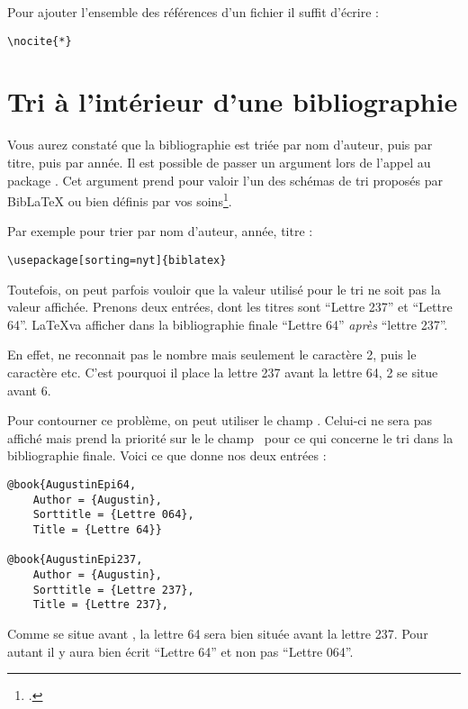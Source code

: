 Pour ajouter l'ensemble des références d'un fichier  il suffit d'écrire :
\begin{verbatim}
\nocite{*}
\end{verbatim}

\section{Tri à l'intérieur d'une bibliographie}

Vous aurez constaté que la bibliographie est triée par nom d'auteur, puis par titre, puis par année. Il est possible de passer un argument  lors de l'appel au package . Cet argument prend pour valoir l'un des schémas de tri proposés par BibLaTeX ou bien définis par vos soins\footcites[Pour les schémas de tri standards voir][]{biblatex_tri}[pour les schémas personnalisés voir][qui nécéssite l'utilisation de Biber (\cf{} \pageref{biber}]{biblatex_triperso}.

Par exemple pour trier par nom d'auteur, année, titre :

\begin{verbatim}
\usepackage[sorting=nyt]{biblatex}
\end{verbatim}

Toutefois, on peut parfois vouloir que  la valeur utilisé pour le tri ne soit pas la valeur affichée. Prenons deux entrées, dont les titres sont \enquote{Lettre 237} et \enquote{Lettre 64}. \LaTeX va afficher dans la bibliographie finale
\enquote{Lettre 64} \emph{après} \enquote{lettre 237}. 

En effet,  ne reconnait pas le nombre  mais seulement le caractère {2}, puis le caractère  etc. C'est pourquoi il place la lettre 237 avant la lettre 64, 2 se situe avant 6.

Pour contourner ce problème, on peut utiliser le champ . Celui-ci ne sera pas affiché mais prend la priorité sur le le champ  pour ce qui concerne le tri dans la bibliographie finale.  Voici ce que donne nos deux entrées :
\begin{verbatim}
@book{AugustinEpi64,
	Author = {Augustin},
	Sorttitle = {Lettre 064},
	Title = {Lettre 64}}
	
@book{AugustinEpi237,
	Author = {Augustin},
	Sorttitle = {Lettre 237},
	Title = {Lettre 237},
\end{verbatim}

Comme  se situe avant , la lettre 64 sera bien située avant la lettre 237. Pour autant il y aura bien écrit \enquote{Lettre 64} et non pas \enquote{Lettre 064}.

